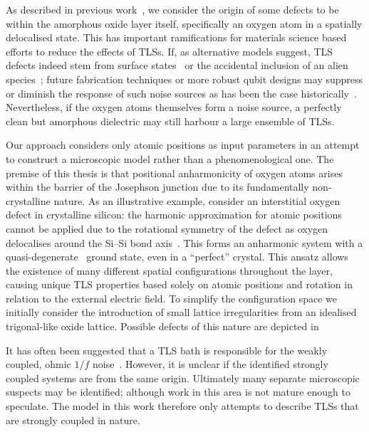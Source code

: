 As described in previous work~\cite{DuBois2013}, we consider the origin of some defects to be within the amorphous oxide layer itself, specifically an oxygen atom in a spatially delocalised state.
This has important ramifications for materials science based efforts to reduce the effects of TLSs.
If, as alternative models suggest, TLS defects indeed stem from surface states~\cite{Choi2009} or the accidental inclusion of an alien species~\cite{Jameson2011, Holder2013}; future fabrication techniques or more robust qubit designs may suppress or diminish the response of such noise sources as has been the case historically~\cite{Vion2002, Martinis2005, Koch2007, Schreier2008, Houck2008}.
Nevertheless, if the oxygen atoms themselves form a noise source, a perfectly clean but amorphous dielectric may still harbour a large ensemble of TLSs.

Our approach considers only atomic positions as input parameters in an attempt to construct a microscopic model rather than a phenomenological one.
The premise of this thesis is that positional anharmonicity of oxygen atoms arises within the  barrier of the Josephson junction due to its fundamentally non-crystalline nature.
As an illustrative example, consider an interstitial oxygen defect in crystalline silicon: the harmonic approximation for atomic positions cannot be applied due to the rotational symmetry of the defect as oxygen delocalises around the Si--Si bond axis~\cite{Artacho1995}.
This forms an anharmonic system with a quasi-degenerate~\cite{DuBois2013} ground state, even in a ``perfect'' crystal.
This ansatz allows the existence of many different spatial configurations throughout the layer, causing unique TLS properties based solely on atomic positions and rotation in relation to the external electric field.
To simplify the configuration space we initially consider the introduction of small lattice irregularities from an idealised trigonal-like  oxide lattice.
Possible defects of this nature are depicted in %



It has often been suggested that a TLS bath is responsible for the weakly coupled, ohmic $1/f$ noise~\cite{Dutta1981}.
However, it is unclear if the identified strongly coupled systems are from the same origin.
Ultimately many separate microscopic suspects may be identified; although work in this area is not mature enough to speculate.
The model in this work therefore only attempts to describe TLSs that are strongly coupled in nature.

